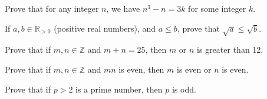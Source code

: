 
\newcommand{\R}{\mathbb{R}}
\newcommand{\Z}{\mathbb{Z}}


Prove that for any integer $n$, we have $n^3-n=3k$ for some integer $k$.


If $a,b\in\R_{>0}$ (positive real numbers), and $a\leq b$, prove that $\sqrt{a}\leq \sqrt{b}$.
	

Prove that if $m,n\in\Z$ and $m+n=25$, then $m$ or $n$ is greater than 12.
	

Prove that if $m,n\in\Z$ and $mn$ is even, then $m$ is even or $n$ is even.
	

Prove that if $p>2$ is a prime number, then $p$ is odd.